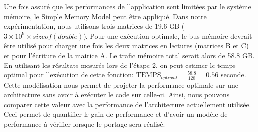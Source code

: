     
    Une fois assuré que les performances de l'application sont limitées par le système mémoire, le Simple Memory Model peut être appliqué. Dans notre expérimentation, nous utilisons trois matrices de 19.6 GB ($3 \times 10^9 \times sizeof(double)$). Pour une exécution optimale, le bus mémoire devrait être utilisé pour charger une fois les deux matrices en lectures (matrices B et C)  et pour l'écriture de la matrice A. Le trafic mémoire total serait alors de 58.8 GB. En utilisant les résultats mesurés lors de l'étape 2, on peut estimer le temps optimal pour l'exécution de cette fonction: $\text{TEMPS}_{optimal} = \frac{58.8}{128} = 0.56$ seconde. Cette modélisation nous permet de projeter la performance optimale sur une architecture sans avoir à exécuter le code sur celle-ci. Ainsi, nous pouvons comparer cette valeur avec la performance de l'architecture actuellement utilisée. Ceci permet de quantifier le gain de performance et d'avoir un modèle de performance à vérifier lorsque le portage sera réalisé.